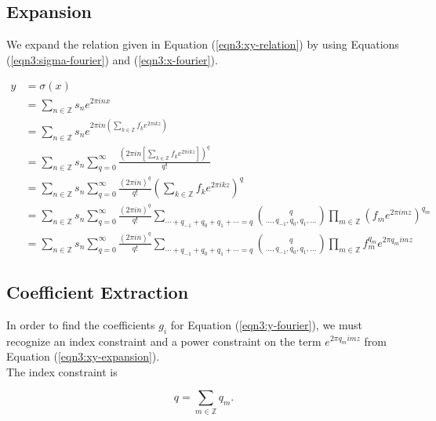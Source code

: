 \documentclass{article}
\begin{document}
    \subsection{Expansion}
    We expand the relation given in Equation (\ref{eqn3:xy-relation}) by using Equations (\ref{eqn3:sigma-fourier}) and (\ref{eqn3:x-fourier}).

    \begin{align}
        y &= \sigma(x) \nonumber \\
        &= \sum_{n \in \mathbb{Z}} s_n e^{2 \pi i n x} \nonumber \\
        &= \sum_{n \in \mathbb{Z}} s_n e^{2 \pi i n \left(\sum_{k \in \mathbb{Z}} f_k e^{2\pi i k z}\right)} \nonumber \\
        &= \sum_{n \in \mathbb{Z}} s_n \sum_{q=0}^{\infty} \frac{\left(2 \pi i n \left[\sum_{k \in \mathbb{Z}} f_k e^{2\pi i k z}\right]\right)^q}{q!} \nonumber \\
        &= \sum_{n \in \mathbb{Z}} s_n \sum_{q=0}^{\infty} \frac{\left(2\pi in\right)^q}{q!} \left(\sum_{k \in \mathbb{Z}} f_k e^{2\pi ikz} \right)^q \nonumber \\
        &= \sum_{n \in \mathbb{Z}} s_n \sum_{q=0}^{\infty} \frac{(2\pi i n)^q}{q!} \sum_{\cdots + q_{-1} + q_{0} + q_{1} + \cdots = q} \binom{q}{\ldots, q_{-1}, q_{0}, q_{1}, \ldots} \prod_{m \in \mathbb{Z}} (f_m e^{2\pi imz})^{q_m} \nonumber \\
        &= \sum_{n \in \mathbb{Z}} s_n \sum_{q=0}^{\infty} \frac{(2\pi i n)^q}{q!} \sum_{\cdots + q_{-1} + q_{0} + q_{1} + \cdots = q} \binom{q}{\ldots, q_{-1}, q_{0}, q_{1}, \ldots} \prod_{m \in \mathbb{Z}} f_m^{q_m} e^{2\pi q_m imz}
        \label{eqn3:xy-expansion}
    \end{align}

    \subsection{Coefficient Extraction}

    In order to find the coefficients $g_i$ for Equation (\ref{eqn3:y-fourier}), we must recognize an index constraint and a power constraint on the term $e^{2\pi q_m imz}$ from Equation (\ref{eqn3:xy-expansion}).\\

    The index constraint is

    \begin{equation}
        q = \sum_{m \in \mathbb{Z}} q_m.
    \end{equation}
\end{document}
